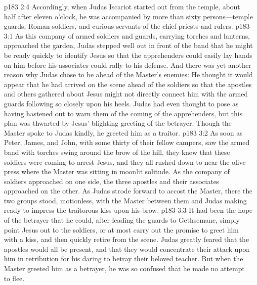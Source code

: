 \vs p183 2:4 Accordingly, when Judas Iscariot started out from the temple, about half after eleven o’clock, he was accompanied by more than sixty persons---temple guards, Roman soldiers, and curious servants of the chief priests and rulers.
\vs p183 3:1 As this company of armed soldiers and guards, carrying torches and lanterns, approached the garden, Judas stepped well out in front of the band that he might be ready quickly to identify Jesus so that the apprehenders could easily lay hands on him before his associates could rally to his defense. And there was yet another reason why Judas chose to be ahead of the Master’s enemies: He thought it would appear that he had arrived on the scene ahead of the soldiers so that the apostles and others gathered about Jesus might not directly connect him with the armed guards following so closely upon his heels. Judas had even thought to pose as having hastened out to warn them of the coming of the apprehenders, but this plan was thwarted by Jesus’ blighting greeting of the betrayer. Though the Master spoke to Judas kindly, he greeted him as a traitor.
\vs p183 3:2 As soon as Peter, James, and John, with some thirty of their fellow campers, saw the armed band with torches swing around the brow of the hill, they knew that these soldiers were coming to arrest Jesus, and they all rushed down to near the olive press where the Master was sitting in moonlit solitude. As the company of soldiers approached on one side, the three apostles and their associates approached on the other. As Judas strode forward to accost the Master, there the two groups stood, motionless, with the Master between them and Judas making ready to impress the traitorous kiss upon his brow.
\vs p183 3:3 It had been the hope of the betrayer that he could, after leading the guards to Gethsemane, simply point Jesus out to the soldiers, or at most carry out the promise to greet him with a kiss, and then quickly retire from the scene. Judas greatly feared that the apostles would all be present, and that they would concentrate their attack upon him in retribution for his daring to betray their beloved teacher. But when the Master greeted him as a betrayer, he was so confused that he made no attempt to flee.
